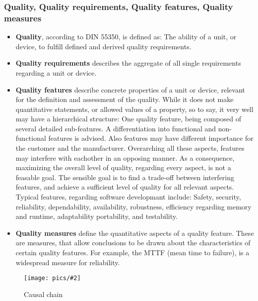\documentclass[master,english,smartquotes,apa]{hgbthesis}
\newcommand \bildGr[5]{\begin{figure}[#1]	\centering	\texttt{[image: pics/\#2]}	\caption{#3}	\label{#4}	\end{figure}}
\begin{document}
	\subsubsection{Quality, Quality requirements, Quality features, Quality measures}
		\begin{itemize}
		\item {\bf Quality}, according to DIN 55350, is defined as: The ability of a unit, or device, to fulfill defined and derived quality requirements.
		\item {\bf Quality requirements} describes the aggregate of all single requirements regarding a unit or device.
		\item {\bf Quality features} describe concrete properties of a unit or device, relevant for the definition and assessment of the quality. While it does not make quantitative statements, or allowed values of a property, so to say, it very well may have a hierarchical structure: One quality feature, being composed of several detailed sub-features. A differentiation into functional and non-functional features is advised. Also features may have different importance for the customer and the manufacturer. Overarching all these aspects, features may interfere with eachother in an opposing manner. As a consequence, maximizing the overall level of quality, regarding every aspect, is not a feasable goal. The sensible goal is to find a trade-off between interfering features, and achieve a sufficient level of quality for all relevant aspects. Typical features, regarding software developmant include: Safety, security, reliability, dependability, availability, robustness, efficiency regarding memory and runtime, adaptability portability, and testability.
		\item {\bf Quality measures} define the quantitative aspects of a quality feature. These are measures, that allow conclusions to be drawn about the characteristics of certain quality features. For example, the MTTF (mean time to failure), is a widespread measure for reliability.
		\end{itemize}
	
	\bildGr{b!}{../images/ErrorFaultFailure.pdf}{Causal chain}{ErrorFaultFailure}{0.5\textwidth}
\end{document}
